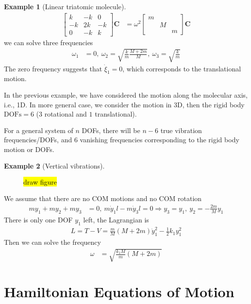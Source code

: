 \documentclass[twoside,9pt]{article}
\numberwithin{equation}{section} %
\newcommand{\lms}{\fontfamily{lmss}\selectfont} %
\theoremstyle{definition}
\newtheorem{example}{\lms Example}[section]
\theoremstyle{remark}
\begin{document}
\begin{example}[Linear triatomic molecule]
\begin{align*}
    \begin{bmatrix}
        k & -k & 0 \\
        -k & 2k & -k \\
        0 & -k & k
    \end{bmatrix}
    \mathbf C &= 
    \omega^2
    \begin{bmatrix}
        m & & \\
          & M & \\
          & & m
    \end{bmatrix}
    \mathbf C
\end{align*}
we can solve three frequencies
\begin{align*}
    \omega_1 &= 0,~
    \omega_2  = \sqrt{\frac{k}{m}\frac{M+2m}{M}},~ 
    \omega_3  = \sqrt{\frac{k}{m}}
\end{align*}
The zero frequency suggests that $\dot\xi_1 = 0$,
which corresponds to the translational motion. 
\end{example}

In the previous example, we have considered the motion along
the molecular axis, i.e., 1D.
In more general case, we consider the motion in 3D,
then the rigid body $\text{DOFs} = 6$ ($3$ rotational and $1$ translational).

For a general system of $n$ DOFs, there will be $n-6$ true vibration
frequencies/DOFs, and $6$ vanishing frequencies corresponding to the
rigid body motion or DOFs.

\begin{example}[Vertical vibrations]
\begin{figure}[H]
    \centering
    \hl{draw figure}
\end{figure}
We assume that there are no COM motions and no COM rotation
\begin{align*}
    my_1 + my_2 + my_3 &= 0,~m\dot y_1l - m\dot y_3l = 0
    \Rightarrow y_3 = y_1,~ y_2 = -\frac{2m}{M}y_1
\end{align*}
There is only one DOF $y_1$ left, the Lagrangian is
\begin{align*}
    L = T - V = \frac{m}{M}(M+2m)\dot y_1^2 - \frac{1}{2}k_1y_1^2
\end{align*}
Then we can solve the frequency
\begin{align*}
    \omega &= \sqrt{
        \frac{k_1M}{m}(M+2m)
    }
\end{align*}
\end{example}


\newpage
\section{Hamiltonian Equations of Motion}
\end{document}
